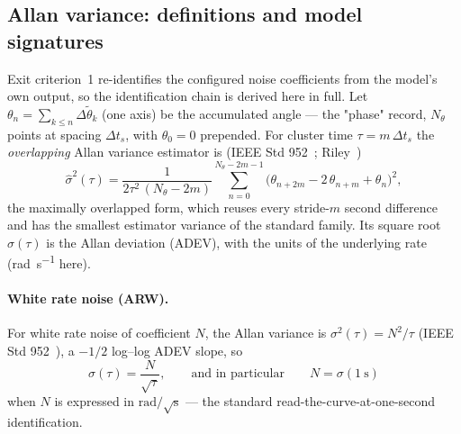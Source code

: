 \subsection{Allan variance: definitions and model signatures}
\label{sec:imu:allanderivation}

Exit criterion~1 re-identifies the configured noise coefficients from the
model's own output, so the identification chain is derived here in full.
Let $\theta_n = \sum_{k \le n} \Delta\tilde{\theta}_k$ (one axis) be the
accumulated angle --- the "phase" record, $N_\theta$ points at spacing
$\Delta t_s$, with $\theta_0 = 0$ prepended. For cluster time
$\tau = m\,\Delta t_s$ the \emph{overlapping} Allan variance estimator is
(IEEE Std 952~\cite{ieee952}; Riley~\cite{riley2008})
\begin{equation}
  \hat{\sigma}^2(\tau) = \frac{1}{2\tau^2\,(N_\theta - 2m)}
    \sum_{n=0}^{N_\theta - 2m - 1}
    \bigl(\theta_{n+2m} - 2\,\theta_{n+m} + \theta_n\bigr)^2 ,
  \label{eq:imu:oadev}
\end{equation}
the maximally overlapped form, which reuses every stride-$m$ second
difference and has the smallest estimator variance of the standard
family. Its square root $\hat{\sigma}(\tau)$ is the Allan deviation
(ADEV), with the units of the underlying rate
(\unit{\radian\per\second} here).

\paragraph{White rate noise (ARW).} For white rate noise of coefficient
$N$, the Allan variance is $\sigma^2(\tau) = N^2/\tau$
(IEEE Std 952~\cite{ieee952}), a $-1/2$ log--log ADEV slope, so
\begin{equation}
  \sigma(\tau) = \frac{N}{\sqrt{\tau}},
  \qquad\text{and in particular}\qquad
  N = \sigma(\qty{1}{\second})
  \label{eq:imu:whiteslope}
\end{equation}
when $N$ is expressed in $\unit{\radian}/\sqrt{\unit{\second}}$ --- the
standard read-the-curve-at-one-second identification.

